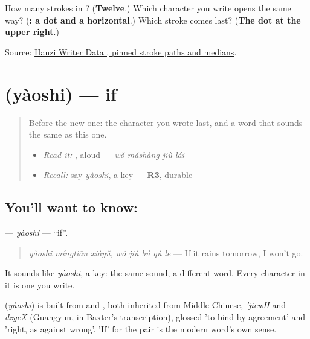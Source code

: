 \begin{tcolorbox}[breakable,colback=teal!4,colframe=teal!35!black,title={Before you move on}]
How many strokes in ? (\textbf{Twelve}.) Which character you write opens the same way? (\textbf{: a dot and a horizontal}.) Which stroke comes last? (\textbf{The dot at the upper right}.)

Source: \href{https://raw.githubusercontent.com/chanind/hanzi-writer-data/68d10a4b21150cae5e1ebbd223eed289cf32d90c/data/\%E5\%B0\%B1.json}{Hanzi Writer Data , pinned stroke paths and medians}.
\end{tcolorbox}
\section[\texorpdfstring{\zh{要是} (yàoshi)}{要是 (yàoshi)}]{ (yàoshi) — if}

\label{lesson:ZH-C288-yaoshi}



\begin{quote}
Before the new one: the character you wrote last, and a word that sounds the same as this one.

\begin{itemize}
\raggedright
  \item \emph{Read it:} , aloud — \emph{wǒ mǎshàng jiù lái}
  \item \emph{Recall:} say \emph{yàoshi}, a key — \textbf{R3}, durable
\end{itemize}
\end{quote}

\subsection*{You'll want to know: }
\textbf{} — \emph{yàoshi} — \textquotedblleft{}if\textquotedblright{}.

\begin{quote}
\textbf{ } \emph{yàoshi míngtiān xiàyǔ, wǒ jiù bú qù le} — If it rains tomorrow, I won't go.
\end{quote}

It sounds like \emph{yàoshi}, a key: the same sound, a different word. Every character in it is one you write.

\begin{cousinweb}
\textbf{} (\emph{yàoshi}) is built from  and , both inherited from Middle Chinese, \emph{'jiewH} and \emph{dzyeX} (Guangyun, in Baxter's transcription), glossed 'to bind by agreement' and 'right, as against wrong'. 'If' for the pair is the modern word's own sense.
\end{cousinweb}

